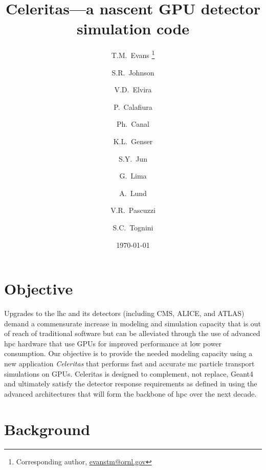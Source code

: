 \documentclass[10pt]{article}
\author[1]{T.M.~Evans
  \footnote{Corresponding author,
  \href{mailto:evanstm@ornl.gov}{evanstm@ornl.gov}}}
\author[1]{S.R.~Johnson}
\author[2]{V.D.~Elvira}
\author[3]{P.~Calafiura}
\author[2]{Ph.~Canal}
\author[2]{K.L.~Genser}
\author[2]{S.Y.~Jun}
\author[2]{G.~Lima}
\author[4]{A.~Lund}
\author[3]{V.R.~Pascuzzi}
\author[1]{S.C.~Tognini}
\affil[1]{Oak Ridge National Laboratory}
\affil[2]{Fermi National Accelerator Laboratory}
\affil[3]{Lawrence Berkeley National Laboratory}
\affil[4]{Argonne National Laboratory}
\title{Celeritas---a nascent GPU detector simulation code}
\date{\today}
\begin{document}
\maketitle

\section*{Objective}

Upgrades to the \ac{lhc} and its detectors (including CMS, ALICE, and ATLAS)
demand a commensurate increase in modeling and simulation capacity that is out
of reach of traditional software but can be alleviated through the use of
advanced \ac{hpc} hardware that use GPUs for improved performance at low power
consumption.  Our objective is to provide the needed modeling capacity using a
new application \emph{Celeritas} that performs fast and accurate \ac{mc}
particle transport simulations on GPUs. Celeritas is designed to complement, not replace, Geant4 and ultimately
satisfy the detector response requirements as defined in
\cite{the_hep_software_foundation_roadmap_2019} using  the advanced
architectures that will form the backbone of \ac{hpc} over the next decade.



\section*{Background}
\end{document}
